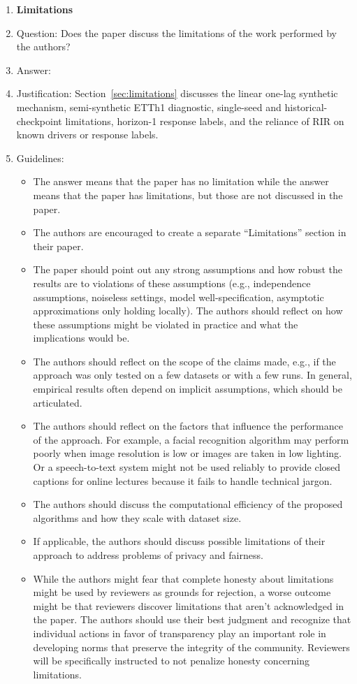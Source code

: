\begin{enumerate}
\item {\bf Limitations}
    \item[] Question: Does the paper discuss the limitations of the work performed by the authors?
    \item[] Answer: \answerYes{}
    \item[] Justification: Section~\ref{sec:limitations} discusses the linear one-lag synthetic mechanism, semi-synthetic ETTh1 diagnostic, single-seed and historical-checkpoint limitations, horizon-1 response labels, and the reliance of RIR on known drivers or response labels.
    \item[] Guidelines:
    \begin{itemize}
        \item The answer \answerNA{} means that the paper has no limitation while the answer \answerNo{} means that the paper has limitations, but those are not discussed in the paper. 
        \item The authors are encouraged to create a separate ``Limitations'' section in their paper.
        \item The paper should point out any strong assumptions and how robust the results are to violations of these assumptions (e.g., independence assumptions, noiseless settings, model well-specification, asymptotic approximations only holding locally). The authors should reflect on how these assumptions might be violated in practice and what the implications would be.
        \item The authors should reflect on the scope of the claims made, e.g., if the approach was only tested on a few datasets or with a few runs. In general, empirical results often depend on implicit assumptions, which should be articulated.
        \item The authors should reflect on the factors that influence the performance of the approach. For example, a facial recognition algorithm may perform poorly when image resolution is low or images are taken in low lighting. Or a speech-to-text system might not be used reliably to provide closed captions for online lectures because it fails to handle technical jargon.
        \item The authors should discuss the computational efficiency of the proposed algorithms and how they scale with dataset size.
        \item If applicable, the authors should discuss possible limitations of their approach to address problems of privacy and fairness.
        \item While the authors might fear that complete honesty about limitations might be used by reviewers as grounds for rejection, a worse outcome might be that reviewers discover limitations that aren't acknowledged in the paper. The authors should use their best judgment and recognize that individual actions in favor of transparency play an important role in developing norms that preserve the integrity of the community. Reviewers will be specifically instructed to not penalize honesty concerning limitations.
    \end{itemize}


\end{enumerate}
